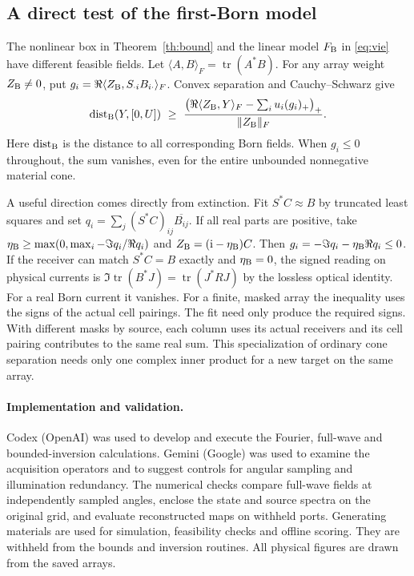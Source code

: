 \documentclass[anonymous,12pt]{iopjournal}
\newcommand{\tr}{\operatorname{tr}}\newcommand{\diag}{\operatorname{diag}}
\newcommand{\dist}{\operatorname{dist}}\newcommand{\rank}{\operatorname{rank}}\newcommand{\ran}{\operatorname{ran}}
\numberwithin{equation}{section}
\begin{document}
\subsection{A direct test of the first-Born model}
The nonlinear box in Theorem~\ref{th:bound} and the linear model $F_{\rm B}$ in \eqref{eq:vie} have different feasible fields. Let $\langle A,B\rangle_F=\tr(A^*B)$. For any array weight $Z_{\rm B}\ne0$, put $g_i=\Re\langle Z_{\rm B},S_{\cdot i}B_{i\cdot}\rangle_F$. Convex separation and Cauchy--Schwarz give
\begin{equation}
 \dist_{\rm B}(Y,[0,U])\ \ge\
 \frac{\big(\Re\langle Z_{\rm B},Y\rangle_F-\sum_i u_i(g_i)_+\big)_+}{\|Z_{\rm B}\|_F}.
 \label{eq:born}
\end{equation}
Here $\dist_{\rm B}$ is the distance to all corresponding Born fields. When $g_i\le0$ throughout, the sum vanishes, even for the entire unbounded nonnegative material cone.

A useful direction comes directly from extinction. Fit $S^*C\approx B$ by truncated least squares and set $q_i=\sum_j(S^*C)_{ij}\overline{B_{ij}}$. If all real parts are positive, take
$\eta_{\rm B}\ge\max(0,\max_i-\Im q_i/\Re q_i)$ and $Z_{\rm B}=(\mathrm i-\eta_{\rm B})C$.
Then $g_i=-\Im q_i-\eta_{\rm B}\Re q_i\le0$. If the receiver can match $S^*C=B$ exactly and $\eta_{\rm B}=0$, the signed reading on physical currents is
$\Im\tr(B^*J)=\tr(J^*RJ)$ by the lossless optical identity. For a real Born current it vanishes. For a finite, masked array the inequality uses the signs of the actual cell pairings. The fit need only produce the required signs. With different masks by source, each column uses its actual receivers and its cell pairing contributes to the same real sum. This specialization of ordinary cone separation needs only one complex inner product for a new target on the same array.

\paragraph{Implementation and validation.}
Codex (OpenAI) was used to develop and execute the Fourier, full-wave and bounded-inversion calculations. Gemini (Google) was used to examine the acquisition operators and to suggest controls for angular sampling and illumination redundancy. The numerical checks compare full-wave fields at independently sampled angles, enclose the state and source spectra on the original grid, and evaluate reconstructed maps on withheld ports. Generating materials are used for simulation, feasibility checks and offline scoring. They are withheld from the bounds and inversion routines. All physical figures are drawn from the saved arrays.
\end{document}
